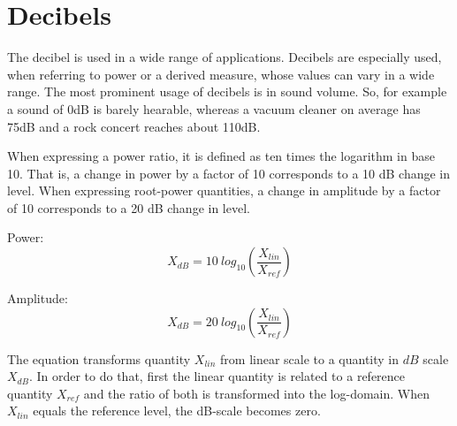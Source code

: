 \documentclass[journal,compsoc]{IEEEtran}
\begin{document}
\section{Decibels}
The decibel is used in a wide range of applications. Decibels are especially used, when referring to power or a derived measure, whose values can vary in a wide range. The most prominent usage of decibels is in sound volume. So, for example a sound of 0dB is barely hearable, whereas a vacuum cleaner on average has 75dB and a rock concert reaches about 110dB.

When expressing a power ratio, it is defined as ten times the logarithm in base 10. That is, a change in power by a factor of 10 corresponds to a 10 dB change in level. When expressing root-power quantities, a change in amplitude by a factor of 10 corresponds to a 20 dB change in level.

Power:
\[ X_{dB} = 10\ log_{10}\left(\frac{X_{lin}}{X_{ref}}\right)\]

Amplitude:
\[ X_{dB} = 20\ log_{10}\left(\frac{X_{lin}}{X_{ref}}\right)\]

The equation transforms quantity \(X_{lin}\) from linear scale to a quantity in \(dB\) scale \(X_{dB}\). In order to do that, first the linear quantity is related to a reference quantity \(X_{ref}\) and the ratio of both is transformed into the log-domain. When \(X_{lin}\) equals the reference level, the dB-scale becomes zero.

\vspace{12pt}
\end{document}
